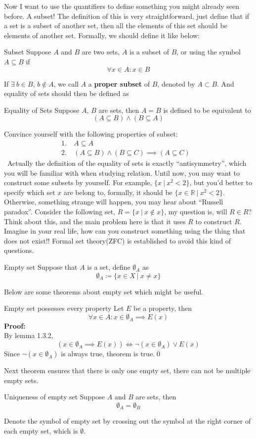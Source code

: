 \documentclass{article}
\begin{document}
Now I want to use the quantifiers to define something you might already seen before. A subset! The definition of this is very straightforward, just
define that if a set is a subset of another set, then all the elements of this set should be elements of another set. Formally, we should define it like
below:
\begin{defin}{Subset}
    Suppose $A$ and $B$ are two sets, $A$ is a subset of $B$, or using the symbol $A \subseteq B$ if
    $$
    \forall x \in A : x \in B
    $$
\end{defin}
If $\exists\ b \in B$, $b \not \in A$, we call $A$ a \textbf{proper subset} of $B$, denoted by $A \subset B$.
And equality of sets should then be defined as
\begin{defin}{Equality of Sets}
    Suppose $A$, $B$ are sets, then
    $A = B$ is defined to be equivalent to
    $$
    (A \subseteq B) \land (B \subseteq A)
    $$
\end{defin}
Convince yourself with the following properties of subset:
\begin{align}
1.\ &A \subseteq A \tag{reflexivity} \\
2.\ &(A\subseteq B) \land(B \subseteq C) \implies (A \subseteq C)\tag{transitivity}&
\end{align}
\quad\ Actually the definition of the equality of sets is exactly ``antisymmetry'', which you will be familiar with when studying relation. Until now, you may want to
construct some subsets by yourself. For example, $\{x\ |\ x^2 < 2\}$, but you'd better to specify which set $x$ are belong to, formally, it should be
$\{x \in \mathbb{R}\ |\  x^2 < 2\}$. Otherwise, something strange will happen, you may hear about ``Russell paradox''. Consider the following set, $R = \{x\ |\ x \not \in x\}$,
my question is, will $R \in R$? Think about this, and the main problem here is that it uses $R$ to construct $R$. Imagine in your real life, how can you construct something
using the thing that does not exist!! Formal set theory(ZFC) is established to avoid this kind of questions.
\begin{defin}{Empty set}
    Suppose that $A$ is a set, define $\emptyset_A$ as
    $$
    \emptyset_A \coloneqq \{x \in X\ |\ x \neq x\}
    $$
\end{defin}
Below are some theorems about empty set which might be useful.
\begin{thm}{Empty set possesses every property}
    Let $E$ be a property, then
    $$
    \forall x \in A : x \in \emptyset_A \implies E(x)
    $$
    \textbf{Proof:}\\
By lemma 1.3.2,
$$
(x \in \emptyset_A \implies E(x)) \iff \neg(x \in \emptyset_A) \lor E(x)
$$
Since $\neg(x \in \emptyset_A)$ is always true, theorem is true.\qed
\end{thm}
Next theorem ensures that there is only one empty set, there can not be multiple empty sets.
\begin{thm}{Uniqueness of empty set}
    Suppose $A$ and $B$ are sets, then
    $$
    \emptyset_A = \emptyset_B
    $$
\end{thm}
Denote the symbol of empty set by crossing out the symbol at the right corner of each empty set, which is $\emptyset$.
\end{document}
